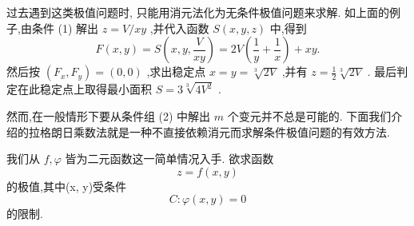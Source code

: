 过去遇到这类极值问题时, 只能用消元法化为无条件极值问题来求解. 如上面的例子,由条件 (1) 解出 \(z = V/{xy}\) ,并代入函数 \(S\left( {x,y,z}\right)\) 中,得到
\[
F\left( {x,y}\right)  = S\left( {x,y,\frac{V}{xy}}\right)  = {2V}\left( {\frac{1}{y} + \frac{1}{x}}\right)  + {xy}.
\]
然后按 \(\left( {{F}_{x},{F}_{y}}\right)  = \left( {0,0}\right)\) ,求出稳定点 \(x = y = \sqrt[3]{2V}\) ,并有 \(z = \frac{1}{2}\sqrt[3]{2V}\) . 最后判定在此稳定点上取得最小面积 \(S = 3\sqrt[3]{4{V}^{2}}\) .

然而,在一般情形下要从条件组 (2) 中解出 \(m\) 个变元并不总是可能的. 下面我们介绍的拉格朗日乘数法就是一种不直接依赖消元而求解条件极值问题的有效方法.

我们从 \(f,\varphi\) 皆为二元函数这一简单情况入手. 欲求函数
\[
z = f\left( {x,y}\right)  \tag{4}
\]
的极值,其中(x, y)受条件
\[
C : \varphi \left( {x,y}\right)  = 0 \tag{5}
\]
的限制.

